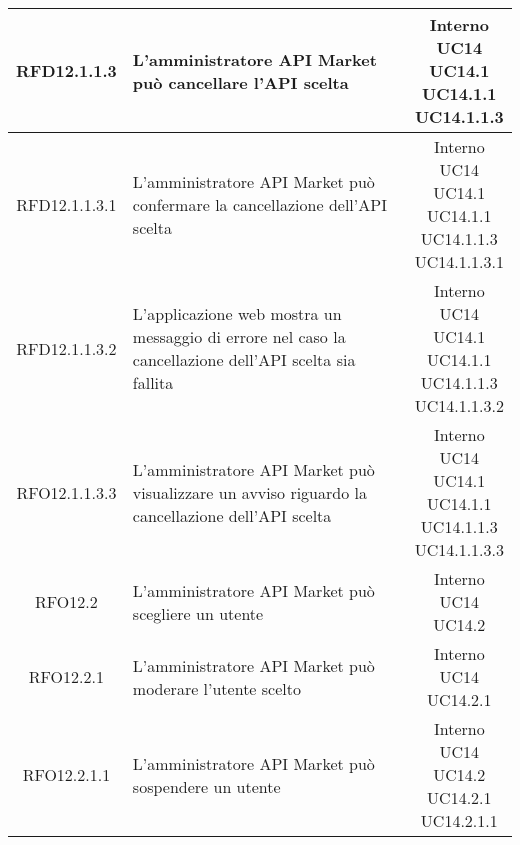 \begin{longtable}{|c|p{8cm}|c|}
\hypertarget{RFD12.1.1.3}{RFD12.1.1.3} & L'amministratore API Market può cancellare l'API scelta & \makecell*{Interno\\UC14\\UC14.1\\UC14.1.1\\UC14.1.1.3} \\
\hline

\hypertarget{RFD12.1.1.3.1}{RFD12.1.1.3.1} & L'amministratore API Market può confermare la cancellazione dell'API scelta & \makecell*{Interno\\UC14\\UC14.1\\UC14.1.1\\UC14.1.1.3\\UC14.1.1.3.1} \\
\hline
\hypertarget{RFD12.1.1.3.2}{RFD12.1.1.3.2} & L'applicazione web mostra un messaggio di errore nel caso la cancellazione dell'API scelta sia fallita & \makecell*{Interno\\UC14\\UC14.1\\UC14.1.1\\UC14.1.1.3\\UC14.1.1.3.2} \\
\hline
\hypertarget{RFO12.1.1.3.3}{RFO12.1.1.3.3} & L'amministratore API Market può visualizzare un avviso riguardo la cancellazione dell'API scelta & \makecell*{Interno\\UC14\\UC14.1\\UC14.1.1\\UC14.1.1.3\\UC14.1.1.3.3} \\
\hline

\hypertarget{RFO12.2}{RFO12.2} & L'amministratore API Market può scegliere un utente & \makecell*{Interno\\UC14\\UC14.2} \\
\hline
\hypertarget{RFO12.2.1}{RFO12.2.1} & L'amministratore API Market può moderare l'utente scelto & \makecell*{Interno\\UC14\\UC14.2.1} \\
\hline

\hypertarget{RFO12.2.1.1}{RFO12.2.1.1} & L'amministratore API Market può sospendere un utente & \makecell*{Interno\\UC14\\UC14.2\\UC14.2.1\\UC14.2.1.1} \\
\hline


\end{longtable}
